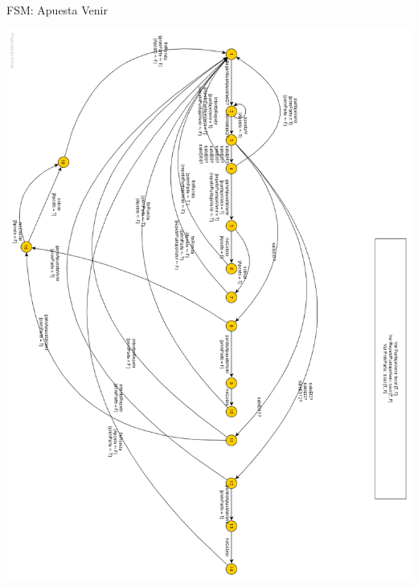 \newpage
{\large FSM: Apuesta Venir }
\begin{center}
\includegraphics[scale=0.4]{img/ApuestaVenir.png}
\end{center}


